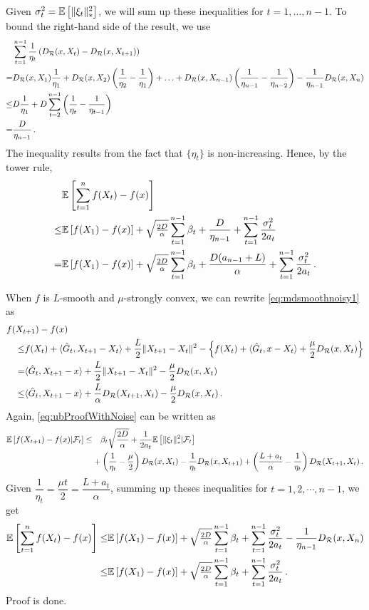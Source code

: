 Given $\sigma_t^2 = \mathbb{E}\left[ \|\xi_t\|_*^2\right]$,
we will sum up these inequalities for $t=1,\dots,n-1$.
To bound the right-hand side of the result, we use
\begin{align*}
&\sum_{t=1}^{n-1} \frac{1}{\eta_t} \left(D_{\mathcal{R}}(x,X_t)-D_{\mathcal{R}}(x,X_{t+1})\right)
 \\
=& D_{\mathcal{R}}(x,X_1) \frac{1}{\eta_1} + D_{\mathcal{R}}(x,X_2) \left(\frac{1}{\eta_2}-\frac{1}{\eta_1}\right)
+ \ldots+D_{\mathcal{R}}(x,X_{n-1}) \left(\frac{1}{\eta_{n-1}} -\frac{1}{\eta_{n-2}}\right)- \frac{1}{\eta_{n-1}} D_{\mathcal{R}}(x,X_n)\\
 \le& D \frac{1}{\eta_1} + D \sum_{t=2}^{n-1} \left(\frac1{\eta_{t}}-\frac1{\eta_{t-1}}\right)\\
 = &\frac{D}{\eta_{n-1}}\,.
\end{align*}
The inequality results from the fact that $\{\eta_t\}$ is non-increasing.
Hence, by the tower rule,
\begin{align*}
 &\mathbb{E}\left[ \sum_{t=1}^n f(X_t) - f(x) \right]  \\
\le& 
  \mathbb{E}\left[f(X_1)-f(x)\right] + \sqrt{\tfrac{2D}{\alpha}} \sum_{t=1}^{n-1} \beta_t +
	   \frac{D}{\eta_{n-1}} +
	  \sum_{t=1}^{n-1}\frac{\sigma_t^2}{2a_t}\\
=& 	  
  \mathbb{E}\left[f(X_1)-f(x)\right] + \sqrt{\tfrac{2D}{\alpha}} \sum_{t=1}^{n-1} \beta_t +
	   \frac{D(a_{n-1}+L)}{\alpha} +
	  \sum_{t=1}^{n-1}\frac{\sigma_t^2}{2a_t}\,.
\end{align*}

When $f$ is $L$-smooth and $\mu$-strongly convex,  we can rewrite \eqref{eq:mdsmoothnoisy1} as
\begin{align*}
\MoveEqLeft
f(X_{t+1}) - f(x) \nonumber\\
 \le& f(X_t) + \ip{ \hat{G}_t, X_{t+1}-X_t } + \frac{L}{2} \norm{X_{t+1}-X_t}^2 - \left\{ f(X_t) + \ip{ \hat{G}_t, x-X_t}+\dfrac{\mu}{2}\DR(x, X_t) \right\} \nonumber \\
 =& \ip{\hat{G}_t, X_{t+1} - x } +  \frac{L}{2} \norm{X_{t+1}-X_t}^2-\dfrac{\mu}{2}\DR(x, X_t) \nonumber\\
 \le& \ip{\hat{G}_t,X_{t+1}-x} + \frac{L}{\alpha} D_{\mathcal{R}}(X_{t+1},X_t)-\dfrac{\mu}{2}\DR(x, X_t)\,.
\end{align*}
Again, \eqref{eq:ubProofWithNoise} can be written as
\begin{align*}
 \mathbb{E}\left[f(X_{t+1}) - f(x) |\mathcal{F}_{t} \right]
\le & \quad
 \beta_t \sqrt{ \frac{2D}{\alpha} }+
\frac{1}{2a_t}  \mathbb{E}\left[\|\xi_t\|_*^2|\mathcal{F}_{t}\right]\\
&+\left(\dfrac{1}{\eta_t}-\dfrac{\mu}{2}  \right)D_{\mathcal{R}}(x,X_t)-\dfrac{1}{\eta_t}D_{\mathcal{R}}(x,X_{t+1})
+\left( \dfrac{L+a_t}{\alpha}-\dfrac{1}{\eta_t} \right)D_{\mathcal{R}}(X_{t+1},X_t) \,.
\end{align*}
Given $\dfrac{1}{\eta_t}=\dfrac{\mu t}{2}=\dfrac{L+a_t}{\alpha}$, summing up theses inequalities for $t=1,2,\cdots, n-1$, we get
\begin{align*}
 \mathbb{E}\left[ \sum_{t=1}^n f(X_t) - f(x) \right]  
\le& 
  \mathbb{E}\left[f(X_1)-f(x)\right] + \sqrt{\tfrac{2D}{\alpha}} \sum_{t=1}^{n-1} \beta_t +
	  \sum_{t=1}^{n-1}\frac{\sigma_t^2}{2a_t}-\dfrac{1}{\eta_{n-1}}D_{\mathcal{R}}(x,X_{n})\\
\le& 	  
  \mathbb{E}\left[f(X_1)-f(x)\right] + \sqrt{\tfrac{2D}{\alpha}} \sum_{t=1}^{n-1} \beta_t +
	  \sum_{t=1}^{n-1}\frac{\sigma_t^2}{2a_t}\,.
\end{align*}
Proof is done.